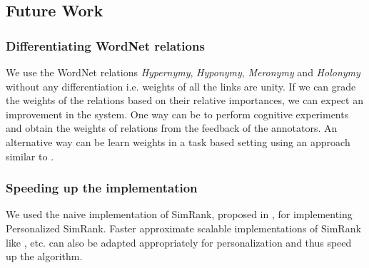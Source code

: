 \subsection{Future Work}

\subsubsection{Differentiating WordNet relations}
We use the WordNet relations \textit{Hypernymy}, \textit{Hyponymy}, \textit{Meronymy} and \textit{Holonymy} without any differentiation i.e. weights of all the links are unity. If we can grade the weights of the relations based on their relative importances, we can expect an improvement in the system. One way can be to perform cognitive experiments and obtain the weights of relations from the feedback of the annotators. An alternative way can be learn weights in a task based setting using an approach similar to \citep{Navigli05SSI}.

\subsubsection{Speeding up the implementation}
We used the naive implementation of SimRank, proposed in \citep{Jeh02simrank}, for implementing Personalized SimRank. Faster approximate scalable implementations of SimRank like \citep{FogarasSimRank}, \citep{LizorkinSimrank} etc. can also be adapted appropriately for personalization and thus speed up the algorithm.

